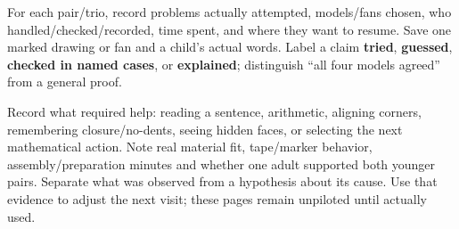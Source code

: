 \documentclass[11pt,letterpaper]{article}
\newcommand{\sub}[1]{\par\vspace{3pt}{\bfseries #1}\par}
\begin{document}
\sub{After the session: an observation, not a verdict}
For each pair/trio, record problems actually attempted, models/fans chosen, who handled/checked/recorded, time spent, and where they want to resume. Save one marked drawing or fan and a child's actual words. Label a claim \textbf{tried}, \textbf{guessed}, \textbf{checked in named cases}, or \textbf{explained}; distinguish ``all four models agreed'' from a general proof.

Record what required help: reading a sentence, arithmetic, aligning corners, remembering closure/no-dents, seeing hidden faces, or selecting the next mathematical action. Note real material fit, tape/marker behavior, assembly/preparation minutes and whether one adult supported both younger pairs. Separate what was observed from a hypothesis about its cause. Use that evidence to adjust the next visit; these pages remain unpiloted until actually used.
\end{document}

